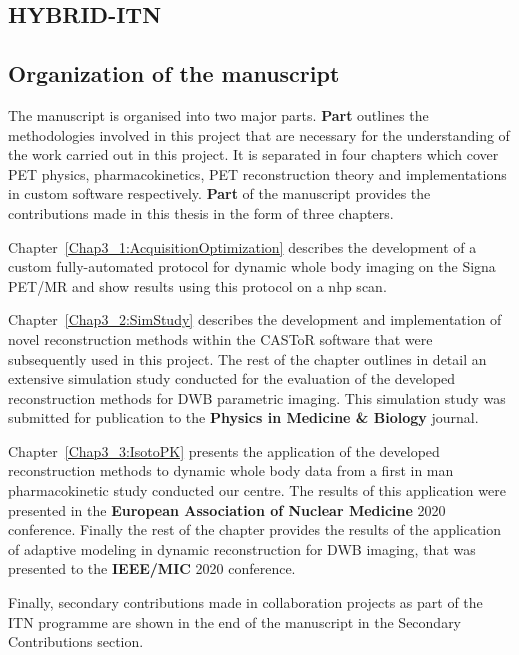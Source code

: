 \subsection*{HYBRID-ITN}


\subsection*{Organization of the manuscript}
The manuscript is organised into two major parts. \textbf{Part } outlines the methodologies involved in this project that are necessary for the understanding of the work carried out in this project. It is separated in four chapters which cover PET physics, pharmacokinetics, PET reconstruction theory and implementations in custom software respectively. \textbf{Part } of the manuscript provides the contributions made in this thesis in the form of three chapters.

Chapter~\ref{Chap3_1:AcquisitionOptimization} describes the development of a custom fully-automated protocol for dynamic whole body imaging on the Signa PET/MR and show results using this protocol on a \gls{nhp} scan.

Chapter~\ref{Chap3_2:SimStudy} describes the development and implementation of novel reconstruction methods within the CASToR software that were subsequently used in this project. The rest of the chapter outlines in detail an extensive simulation study conducted for the evaluation of the developed reconstruction methods for DWB parametric imaging. This simulation study was submitted for publication to the
\textbf{Physics in Medicine \& Biology} journal. 

Chapter~\ref{Chap3_3:IsotoPK} presents the application of the developed reconstruction methods to dynamic whole body data from a first in man pharmacokinetic study conducted our centre. The results of this application were presented in the \textbf{European Association of Nuclear Medicine} 2020 conference. Finally the rest of the chapter provides the results of the application of adaptive modeling in dynamic reconstruction for DWB imaging, that was presented to the \textbf{IEEE/MIC} 2020 conference. 

Finally, secondary contributions made in collaboration projects as part of the ITN programme are shown in the end of the manuscript in the Secondary Contributions section. 